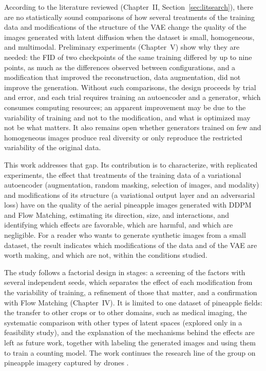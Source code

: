 According to the literature reviewed (Chapter~II, Section~\ref{sec:litsearch}), there are no statistically sound comparisons of how several treatments of the training data and modifications of the structure of the VAE change the quality of the images generated with latent diffusion when the dataset is small, homogeneous, and multimodal. Preliminary experiments (Chapter~V) show why they are needed: the FID of two checkpoints of the same training differed by up to nine points, as much as the differences observed between configurations, and a modification that improved the reconstruction, data augmentation, did not improve the generation. Without such comparisons, the design proceeds by trial and error, and each trial requires training an autoencoder and a generator, which consumes computing resources; an apparent improvement may be due to the variability of training and not to the modification, and what is optimized may not be what matters. It also remains open whether generators trained on few and homogeneous images produce real diversity or only reproduce the restricted variability of the original data.

This work addresses that gap. Its contribution is to characterize, with replicated experiments, the effect that treatments of the training data of a variational autoencoder (augmentation, random masking, selection of images, and modality) and modifications of its structure (a variational output layer and an adversarial loss) have on the quality of the aerial pineapple images generated with DDPM and Flow Matching, estimating its direction, size, and interactions, and identifying which effects are favorable, which are harmful, and which are negligible. For a reader who wants to generate synthetic images from a small dataset, the result indicates which modifications of the data and of the VAE are worth making, and which are not, within the conditions studied.

The study follows a factorial design in stages: a screening of the factors with several independent seeds, which separates the effect of each modification from the variability of training, a refinement of those that matter, and a confirmation with Flow Matching (Chapter~IV). It is limited to one dataset of pineapple fields: the transfer to other crops or to other domains, such as medical imaging, the systematic comparison with other types of latent spaces (explored only in a feasibility study), and the explanation of the mechanisms behind the effects are left as future work, together with labeling the generated images and using them to train a counting model. The work continues the research line of the group on pineapple imagery captured by drones \cite{XieLi2024,Gonzalez2026}.

